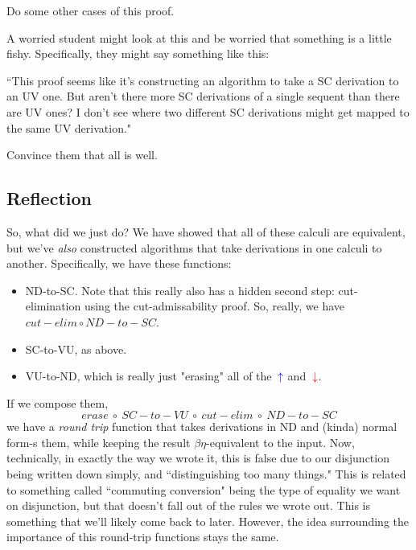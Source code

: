 \documentclass{article}
\begin{document}
\begin{exercise}
    Do some other cases of this proof.
\end{exercise}
\begin{exercise}
    A worried student might look at this and be worried that something is a little fishy. Specifically, they might say something like this: 
    \begin{adjustwidth}{1.5cm}{1.5cm}
    ``This proof seems like it's constructing an algorithm to take a SC derivation to an UV one. But aren't there more SC derivations of a single sequent than there are UV ones? I don't see where two different SC derivations might get mapped to the same UV derivation."
    \end{adjustwidth}
    Convince them that all is well.
\end{exercise}

\subsection{Reflection}
So, what did we just do? We have showed that all of these calculi are equivalent, but we've \textit{also} constructed algorithms that take derivations in one calculi to another. Specifically, we have these functions:
\begin{itemize}
    \item ND-to-SC. Note that this really also has a hidden second step: cut-elimination using the cut-admissability proof. So, really, we have $cut-elim \circ ND-to-SC$.
    \item SC-to-VU, as above.
    \item VU-to-ND, which is really just "erasing" all of the $\textcolor{blue}{\,\uparrow}$ and $\textcolor{red}{\,\downarrow}$.
\end{itemize}
If we compose them,
$$erase ~\circ~ SC-to-VU ~\circ~ cut-elim ~\circ~ ND-to-SC$$
we have a \textit{round trip} function that takes derivations in ND and (kinda) normal form-s them, while keeping the result $\beta \eta$-equivalent to the input. Now, technically, in exactly the way we wrote it, this is false due to our disjunction being written down simply, and ``distinguishing too many things." This is related to something called ``commuting conversion" being the type of equality we want on disjunction, but that doesn't fall out of the rules we wrote out. This is something that we'll likely come back to later. However, the idea surrounding the importance of this round-trip functions stays the same.
\end{document}
